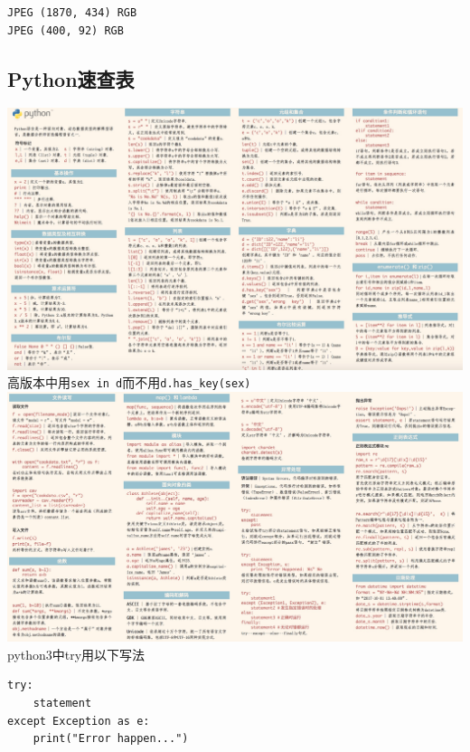 \documentclass[11pt]{article}
\makeatletter
\def\maxwidth{\ifdim\Gin@nat@width>\linewidth\linewidth
    \else\Gin@nat@width\fi}
\let\Oldincludegraphics\includegraphics
\renewcommand{\includegraphics}[1]{\Oldincludegraphics[width=.8\maxwidth]{#1}}
\makeatother
\begin{document}
    \begin{Verbatim}[commandchars=\\\{\}]
JPEG (1870, 434) RGB
JPEG (400, 92) RGB

    \end{Verbatim}

    \subsection{Python速查表}\label{pythonux901fux67e5ux8868}

\includegraphics{./python-cheatsheet1.png}
高版本中用\texttt{\textquotesingle{}sex\textquotesingle{}\ in\ d}而不用\texttt{d.has\_key(\textquotesingle{}sex\textquotesingle{})}
\includegraphics{./python-cheatsheet2.png} python3中try用以下写法

\begin{verbatim}
try:
    statement
except Exception as e:
    print("Error happen...")
\end{verbatim}


    
    
    
    
\end{document}
